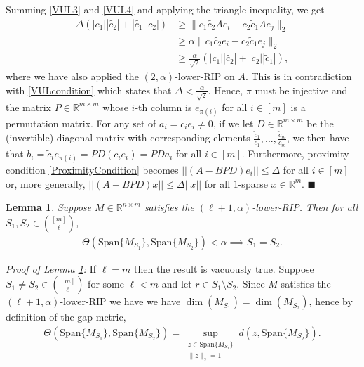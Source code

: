 \documentclass[journal,onecolumn]{IEEEtran}
\newtheorem{lemma}{Lemma}
\begin{document}
Summing \eqref{VUL3} and \eqref{VUL4} and applying the triangle inequality, we get
\begin{align*}
\Delta(|c_1||\tilde{c_2}|+ |\tilde{c_1}| |c_2|) &\geq  \|c_1\tilde{c_2}Ae_i - c_2\tilde{c}_1Ae_j\|_2 \\
&\geq \alpha \|c_1\tilde{c_2}e_i - c_2\tilde{c}_1e_j\|_2 \\
&\geq \frac{\alpha}{\sqrt{2}}(|c_1| |\tilde{c_2}| + |c_2| |\tilde{c}_1| ),
\end{align*}
%
where we have also applied the $(2,\alpha)$-lower-RIP on $A$. This is in contradiction with \eqref{VULcondition} which states that $\Delta < \frac{\alpha}{\sqrt{2}}$. Hence, $\pi$ must be injective and the matrix $P \in \mathbb{R}^{m \times m}$ whose $i$-th column is $e_{\pi(i)}$ for all $i \in [m]$ is a permutation matrix. For any set of $a_i = c_ie_i \neq 0$, if we let $D \in \mathbb{R}^{m \times m}$ be the (invertible) diagonal matrix with corresponding elements $\frac{\tilde{c}_1}{c_1}, ..., \frac{\tilde{c}_m}{c_m}$, we then have that $b_i = \tilde{c}_ie_{\pi(i)} = PD(c_ie_i) = PDa_i$ for all $i \in [m]$. Furthermore, proximity condition \eqref{ProximityCondition} becomes $||(A - BPD)e_i|| \leq \Delta$ for all $i \in [m]$ or, more generally, $||(A - BPD)x|| \leq \Delta||x||$ for all $1$-sparse $x \in \mathbb{R}^m$. $\blacksquare$


\begin{lemma}\label{RIPImpliesGapLemma}
Suppose $M \in \mathbb{R}^{n \times m}$ satisfies the $(\ell+1,\alpha)$-lower-RIP. Then for all $S_1,S_2 \in {[m] \choose \ell}$,
\begin{align}
\Theta( \text{Span}\{M_{S_1}\},\text{Span}\{M_{S_2}\}) < \alpha \implies S_1 = S_2.
\end{align}
\end{lemma}

\emph{Proof of Lemma \ref{RIPImpliesGapLemma}:} If $\ell = m$ then the result is vacuously true. Suppose $S_1 \neq S_2 \in {[m] \choose \ell}$ for some $\ell < m$ and let $r \in S_1 \setminus S_2$. Since $M$ satisfies the $(\ell+1,\alpha)$-lower-RIP we have we have $\dim(M_{S_1}) = \dim(M_{S_2})$, hence by definition of the gap metric,
\begin{align*}
\Theta( \text{Span}\{M_{S_1}\},\text{Span}\{M_{S_2}\})
= \sup_{\substack{ z \in \text{Span}\{M_{S_1}\} \\ \|z\|_2 = 1} } d(z, \text{Span}\{M_{S_2}\}).
\end{align*}
\end{document}
